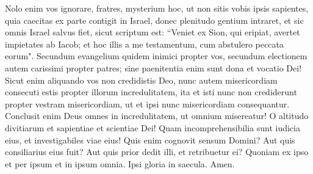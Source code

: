 \begin{biblechapter}
\verse Nolo enim vos ignorare, fratres, mysterium hoc, ut non sitis vobis ipsis sapientes, quia caecitas ex parte contigit in Israel, donec plenitudo gentium intraret,  
\verse et sic omnis Israel salvus fiet, sicut scriptum est: “Veniet ex Sion, qui eripiat, avertet impietates ab Iacob; 
\verse et hoc illis a me testamentum, cum abstulero peccata eorum". 
\verse Secundum evangelium quidem inimici propter vos, secundum electionem autem carissimi propter patres; 
\verse sine paenitentia enim sunt dona et vocatio Dei!  
\verse Sicut enim aliquando vos non credidistis Deo, nunc autem misericordiam consecuti estis propter illorum incredulitatem, 
\verse ita et isti nunc non crediderunt propter vestram misericordiam, ut et ipsi nunc misericordiam consequantur. 
\verse Conclusit enim Deus omnes in incredulitatem, ut omnium misereatur! 
\verse O altitudo divitiarum et sapientiae et scientiae Dei! Quam incomprehensibilia sunt iudicia eius, et investigabiles viae eius! 
\verse Quis enim cognovit sensum Domini? Aut quis consiliarius eius fuit? 
\verse Aut quis prior dedit illi, et retribuetur ei? 
\verse Quoniam ex ipso et per ipsum et in ipsum omnia. Ipsi gloria in saecula. Amen. 
\end{biblechapter}

